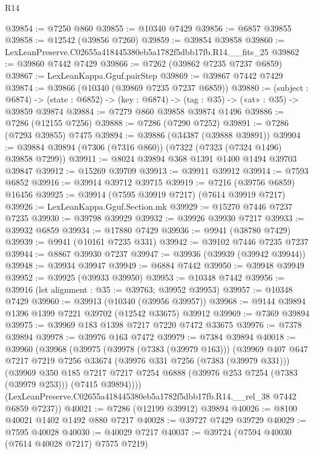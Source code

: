 \begin{lexlean}{R14}
\begin{coremodule}
@39854 := @7250 @860
@39855 := @10340 @7429
@39856 := @6857 @39855
@39858 := @12542 (@39856 @7260)
@39859 := @39854 @39858
@39860 := LexLeanPreserve.C02655a418445380eb5a1782f5dbb17fb.R14.__fits_25
@39862 := @39860 @7442 @7429
@39866 := @7262 (@39862 @7235 @7237 @6859)
@39867 := LexLeanKappa.Gguf.pairStep
@39869 := @39867 @7442 @7429
@39874 := @39866 (@10340 (@39869 @7235 @7237 @6859))
@39880 := (subject : @6874) ->
  (state : @6852) -> (key : @6874) -> (tag : @35) -> («at» : @35) -> @39859 @39874
@39884 := @7279 @860 @39858 @39874 @1496
@39886 := @7286 (@12155 @7256)
@39888 := @7286 (@7290 @7252)
@39891 := @7286 (@7293 @39855) @7475
@39894 := @39886 (@34387 (@39888 @39891))
@39904 := @39884 @39894 (@7306 (@7316 @860)) (@7322 (@7323 (@7324 @1496) @39858 @7299))
@39911 := @8024 @39894 @368 @1391 @1400 @1494 @39703 @39847
@39912 := @15269 @39709
@39913 := @39911 @39912
@39914 := @7593 @6852
@39916 := @39914 @39712 @39715
@39919 := @7216 (@39756 @6859) @16456
@39925 := @39914 (@7595 @39919 @7217) (@7614 @39919 @7217)
@39926 := LexLeanKappa.Gguf.Section.mk
@39929 := @15270 @7446 @7237 @7235
@39930 := @39798 @39929
@39932 := @39926 @39930 @7217
@39933 := @39932 @6859
@39934 := @17880 @7429
@39936 := @9941 (@38780 @7429)
@39939 := @9941 (@10161 @7235 @331)
@39942 := @39102 @7446 @7235 @7237
@39944 := @8867 @39930 @7237
@39947 := @39936 (@39939 (@39942 @39944))
@39948 := @39934 @39947
@39949 := @6884 @7442
@39950 := @39948 @39949
@39952 := @39925 (@39933 @39950)
@39953 := @10348 @7442
@39956 := @39916 (let alignment : @35 := @39763; @39952 @39953)
@39957 := @10348 @7429
@39960 := @39913 (@10340 (@39956 @39957))
@39968 := @9144 @39894 @1396 @1399 @7221 @39702 (@12542 @33675) @39912
@39969 := @7369 @39894
@39975 := @39969 @183 @1398 @7217 @7220 @7472 @33675
@39976 := @7378 @39894
@39978 := @39976 @163 @7472
@39979 := @7384 @39894
@40018 := @39960
    (@39968
      (@39975
        (@39978 (@7383 (@39979 @163)))
        (@39969
          @407
          @647
          @7217
          @7219
          @7256
          @33674
          (@39976 @331 @7256 (@7383 (@39979 @331)))
          (@39969
            @350
            @185
            @7217
            @7217
            @7254
            @6888
            (@39976 @253 @7254 (@7383 (@39979 @253)))
            (@7415 @39894))))
      (LexLeanPreserve.C02655a418445380eb5a1782f5dbb17fb.R14.__rel_38 @7442 @6859 @7237))
@40021 := @7286 (@12199 @39912) @39894
@40026 := @8100 @40021 @1402 @1492 @880 @7217
@40028 := @39727 @7429 @39729
@40029 := @7595 @40028
@40030 := @40029 @7217
@40037 := @39724 (@7594 @40030 (@7614 @40028 @7217) @7575 @7219)

\end{coremodule}
\end{lexlean}

